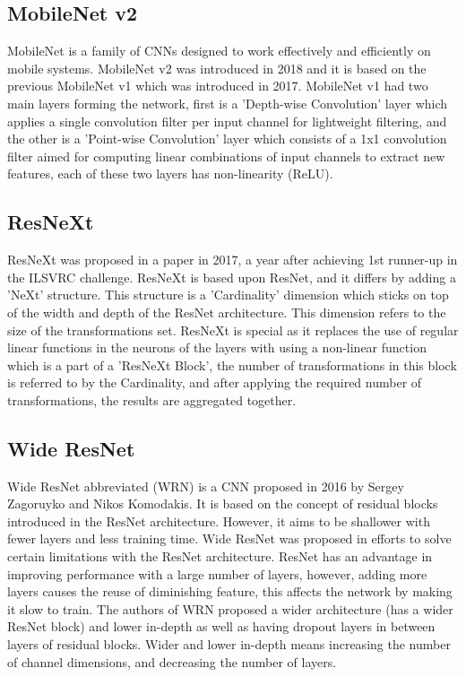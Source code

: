 \documentclass[conference]{IEEEtran}
\begin{document}
\subsection{MobileNet v2}
MobileNet is a family of CNNs designed to work effectively and efficiently on mobile systems. MobileNet v2 was introduced in 2018 and it is based on the previous MobileNet v1\cite{howard2017mobilenets} which was introduced in 2017. MobileNet v1 had two main layers forming the network, first is a 'Depth-wise Convolution' layer which applies a single convolution filter per input channel for lightweight filtering, and the other is a 'Point-wise Convolution' layer which consists of a 1x1 convolution filter aimed for computing linear combinations of input channels to extract new features, each of these two layers has non-linearity (ReLU).





\subsection{ResNeXt}
ResNeXt was proposed in a paper in 2017, a year after achieving 1st runner-up in the ILSVRC challenge. ResNeXt is based upon ResNet, and it differs by adding a 'NeXt' structure. This structure is a 'Cardinality' dimension which sticks on top of the width and depth of the ResNet architecture. This dimension refers to the size of the transformations set. ResNeXt is special as it replaces the use of regular linear functions in the neurons of the layers with using a non-linear function which is a part of a 'ResNeXt Block', the number of transformations in this block is referred to by the Cardinality, and after applying the required number of transformations, the results are aggregated together.



\subsection{Wide ResNet}
Wide ResNet abbreviated (WRN) is a CNN proposed in 2016 by Sergey Zagoruyko and Nikos Komodakis. It is based on the concept of residual blocks introduced in the ResNet architecture. However, it aims to be shallower with fewer layers and less training time. Wide ResNet was proposed in efforts to solve certain limitations with the ResNet architecture. ResNet has an advantage in improving performance with a large number of layers, however, adding more layers causes the reuse of diminishing feature, this affects the network by making it slow to train. The authors of WRN proposed a wider architecture (has a wider ResNet block) and lower in-depth as well as having dropout layers in between layers of residual blocks. Wider and lower in-depth means increasing the number of channel dimensions, and decreasing the number of layers.
\end{document}
